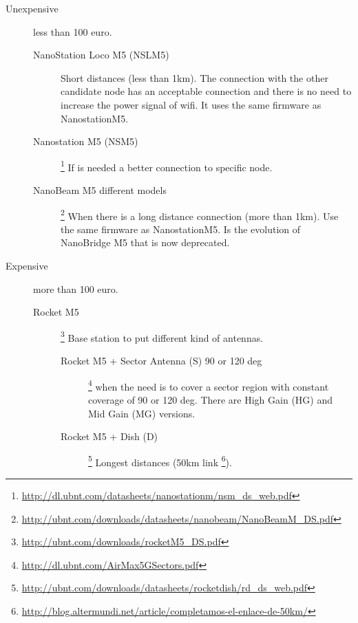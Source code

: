 \documentclass[11pt]{article}
\begin{document}
\begin{description}
\item[{Unexpensive}] less than 100 euro.

\begin{description}
\item[{NanoStation Loco M5 (NSLM5)}] Short distances (less than
1km). The connection with the other candidate node has an
acceptable connection and there is no need to increase the
power signal of wifi. It uses the same firmware as
NanostationM5.
\item[{Nanostation M5 (NSM5)}] \footnote{\url{http://dl.ubnt.com/datasheets/nanostationm/nsm_ds_web.pdf}} If is needed a better connection to
specific node.
\item[{NanoBeam M5 different models}] \footnote{\url{http://ubnt.com/downloads/datasheets/nanobeam/NanoBeamM_DS.pdf}} When there is a long
distance connection (more than 1km). Use the same firmware as
NanostationM5. Is the evolution of NanoBridge M5 that is now
deprecated.
\end{description}

\item[{Expensive}] more than 100 euro.

\begin{description}
\item[{Rocket M5 }] \footnote{\url{http://ubnt.com/downloads/rocketM5_DS.pdf}} Base station to put different kind of antennas.
\begin{description}
\item[{Rocket M5 + Sector Antenna (S) 90 or 120 deg}] \footnote{\url{http://dl.ubnt.com/AirMax5GSectors.pdf}} when the need
is to cover a sector region with constant coverage of 90 or
120 deg. There are High Gain (HG) and Mid Gain (MG) versions.
\item[{Rocket M5 + Dish (D)}] \footnote{\url{http://ubnt.com/downloads/datasheets/rocketdish/rd_ds_web.pdf}} Longest distances (50km link \footnote{\url{http://blog.altermundi.net/article/completamos-el-enlace-de-50km/}}).
\end{description}
\end{description}
\end{description}
\end{document}
